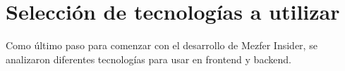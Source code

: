 \section{Selección de tecnologías a utilizar}
Como último paso para comenzar con el desarrollo de Mezfer Insider, se analizaron diferentes tecnologías para usar en frontend y backend.
    
    
    